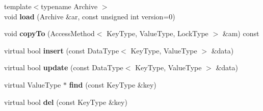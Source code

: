 \begin{CompactItemize}
\item 
\hypertarget{classLinearHashTable_2034e3f01b1635d606a0cac7473c44fa}{
{\footnotesize template$<$typename Archive $>$ }\\void \textbf{load} (Archive \&ar, const unsigned int version=0)}
\label{classLinearHashTable_2034e3f01b1635d606a0cac7473c44fa}

\item 
\hypertarget{classLinearHashTable_d6d8cf1cadf308a9046bc840258421ef}{
void \textbf{copyTo} (AccessMethod$<$ KeyType, ValueType, LockType $>$ \&am) const }
\label{classLinearHashTable_d6d8cf1cadf308a9046bc840258421ef}

\item 
\hypertarget{classLinearHashTable_1e308125876860695f39903999c00002}{
virtual bool \textbf{insert} (const DataType$<$ KeyType, ValueType $>$ \&data)}
\label{classLinearHashTable_1e308125876860695f39903999c00002}

\item 
\hypertarget{classLinearHashTable_36409b1f8b938bff754c78b1e6a82624}{
virtual bool \textbf{update} (const DataType$<$ KeyType, ValueType $>$ \&data)}
\label{classLinearHashTable_36409b1f8b938bff754c78b1e6a82624}

\item 
\hypertarget{classLinearHashTable_112a278af50345335a469d88718fbe1a}{
virtual ValueType $\ast$ \textbf{find} (const KeyType \&key)}
\label{classLinearHashTable_112a278af50345335a469d88718fbe1a}

\item 
\hypertarget{classLinearHashTable_60a358efba34efa531f76b6d1a1b2389}{
virtual bool \textbf{del} (const KeyType \&key)}
\label{classLinearHashTable_60a358efba34efa531f76b6d1a1b2389}

\end{CompactItemize}
